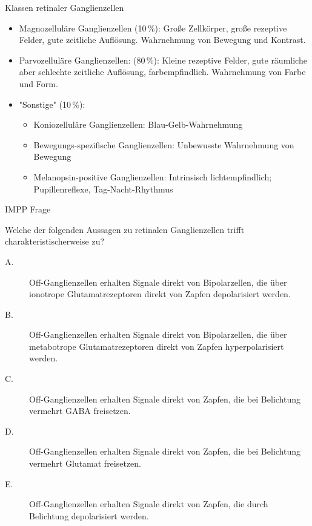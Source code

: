\documentclass{beamer}
\begin{document}
\begin{frame}{Klassen retinaler Ganglienzellen}

\begin{itemize}
    \item 
    Magnozelluläre Ganglienzellen (10\,\%): Große Zellkörper, große rezeptive Felder, gute zeitliche Auflösung. Wahrnehmung von Bewegung und Kontrast.
    \pause
    \item
    Parvozelluläre Ganglienzellen: (80\,\%): Kleine rezeptive Felder, gute räumliche aber schlechte zeitliche Auflösung, farbempfindlich. Wahrnehmung von Farbe und Form.
    \pause
    \item
    "Sonstige" (10\,\%):
    \begin{itemize}
        \item Koniozelluläre Ganglienzellen: Blau-Gelb-Wahrnehmung
        \item Bewegungs-spezifische Ganglienzellen: Unbewusste Wahrnehmung von Bewegung
    \item Melanopsin-positive Ganglienzellen: Intrinsisch lichtempfindlich; Pupillenreflexe, Tag-Nacht-Rhythmus
    \end{itemize}
\end{itemize}


\end{frame}


\begin{frame}{IMPP Frage}

Welche der folgenden Aussagen zu retinalen Ganglienzellen trifft charakteristischerweise zu?

\begin{description}
\item[A.] Off-Ganglienzellen erhalten Signale direkt von Bipolarzellen, die über ionotrope Glutamatrezeptoren direkt von Zapfen depolarisiert werden. %
\item[B.] Off-Ganglienzellen erhalten Signale direkt von Bipolarzellen, die über metabotrope Glutamatrezeptoren direkt von Zapfen hyperpolarisiert werden. 
\item[C.] Off-Ganglienzellen erhalten Signale direkt von Zapfen, die bei Belichtung vermehrt GABA freisetzen.
\item[D.] Off-Ganglienzellen erhalten Signale direkt von Zapfen, die bei Belichtung vermehrt Glutamat freisetzen.
\item[E.] Off-Ganglienzellen erhalten Signale direkt von Zapfen, die durch Belichtung depolarisiert werden.
\end{description}

    
\end{frame}
\end{document}
